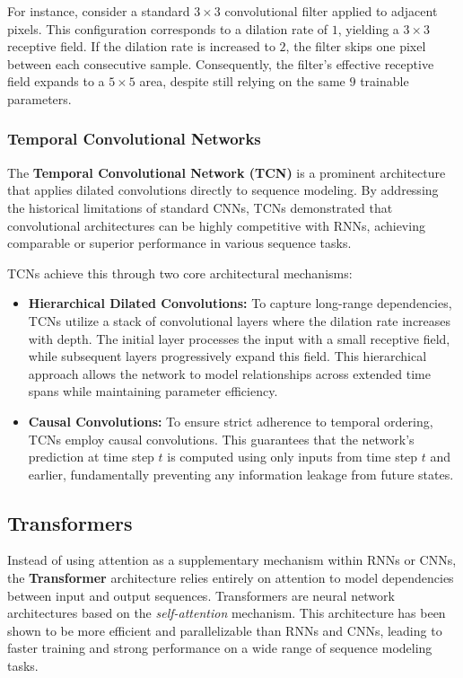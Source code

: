 For instance, consider a standard $3 \times 3$ convolutional filter applied to adjacent pixels. This configuration corresponds to a dilation rate of $1$, yielding a $3 \times 3$ receptive field. 
If the dilation rate is increased to $2$, the filter skips one pixel between each consecutive sample. Consequently, the filter's effective receptive field expands to a $5 \times 5$ area, despite still relying on the same $9$ trainable parameters.

\subsubsection{Temporal Convolutional Networks}
The \textbf{Temporal Convolutional Network (TCN)} is a prominent architecture that applies dilated convolutions directly to sequence modeling.
By addressing the historical limitations of standard CNNs, TCNs demonstrated that convolutional architectures can be highly competitive with RNNs, achieving comparable or superior performance in various sequence tasks.

TCNs achieve this through two core architectural mechanisms:
\begin{itemize}
    \item \textbf{Hierarchical Dilated Convolutions:} To capture long-range dependencies, TCNs utilize a stack of convolutional layers where the dilation rate increases with depth. The initial layer processes the input with a small receptive field, while subsequent layers progressively expand this field. This hierarchical approach allows the network to model relationships across extended time spans while maintaining parameter efficiency.
    \item \textbf{Causal Convolutions:} To ensure strict adherence to temporal ordering, TCNs employ causal convolutions. This guarantees that the network's prediction at time step $t$ is computed using only inputs from time step $t$ and earlier, fundamentally preventing any information leakage from future states.
\end{itemize}

\subsection{Transformers}
Instead of using attention as a supplementary mechanism within RNNs or CNNs, the \textbf{Transformer} architecture relies entirely on attention to model dependencies between input and output sequences.
Transformers are neural network architectures based on the \textit{self-attention} mechanism.
This architecture has been shown to be more efficient and parallelizable than RNNs and CNNs, leading to faster training and strong performance on a wide range of sequence modeling tasks.

